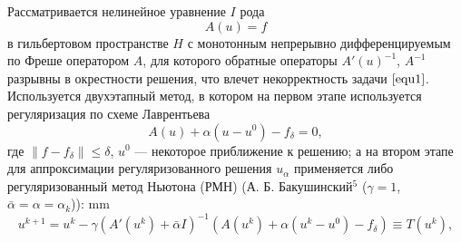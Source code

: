 \documentclass[%
autoref,     %
href,        %
colorlinks,  %
]{disser}
\newtheorem*{remark}{Замечание}
\begin{document}
Рассматривается нелинейное уравнение $I$ рода
\begin{equation}\label{equ1}A(u)=f\end{equation}
в гильбертовом пространстве $H$ с монотонным непрерывно дифференцируемым по Фреше оператором $A$, для которого обратные операторы $A'(u)^{-1}$, $A^{-1}$ разрывны в окрестности решения, что влечет некорректность задачи $\eqref{equ1}$. Используется двухэтапный метод, в котором на первом этапе используется регуляризация по схеме Лаврентьева
\begin{equation}\label{equ2}A(u)+\alpha(u-u^0)-f_\delta=0,\end{equation}
где $\|f-f_\delta\|\leqslant\delta$, $u^0$ --- некоторое приближение к решению; а на втором этапе для аппроксимации регуляризованного решения $u_\alpha$ применяется либо регуляризованный метод Ньютона (РМН) (А. Б. Бакушинский$^5$ ($\gamma=1$, $\bar{\alpha}=\alpha=\alpha_k$)):
 mm
{\scriptsize
	\let\thefootnote\relax\let\thefootnote\relax{}
}
\begin{equation}\label{equ_rmn}
u^{k+1}=u^k-\gamma(A'(u^k)+\bar\alpha I)^{-1}(A(u^k)+\alpha(u^k-u^0)-f_\delta)\equiv{T(u^k)},
\end{equation}
\end{document}
